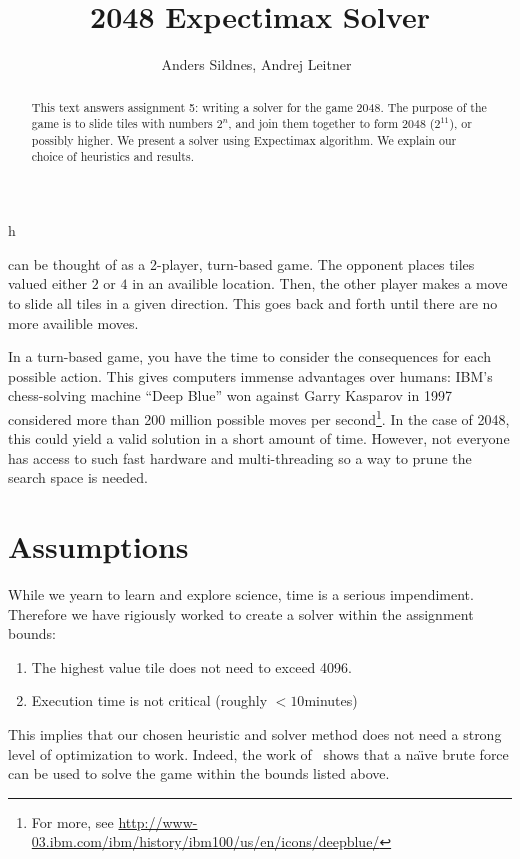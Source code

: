 \documentclass[journal]{IEEEtran}
\def\naive{na\"{\i}ve}
\begin{document}
%
\title{2048 Expectimax Solver}

\author{Anders Sildnes, Andrej Leitner~%
}%

%
{h}

\maketitle

\begin{abstract}
    This text answers assignment 5: writing a solver for the game 2048.
    The purpose of the game is to slide tiles with numbers $2^{n}$, and join them
    together to form 2048 ($2^{11}$), or possibly higher.
    We present a solver using Expectimax algorithm. We explain our choice of
    heuristics and results.
\end{abstract}

 can be thought of as a 2-player, turn-based game. The
opponent places tiles valued either $2$ or $4$ in an availible location. Then,
the other player makes a move to slide all tiles in a given direction. This
goes back and forth until there are no more availible moves.

In a turn-based game, you have the time to consider the consequences for each possible
action. This gives computers immense advantages over humans:
IBM's chess-solving machine ``Deep Blue'' won against Garry Kasparov in 1997 considered more than
200 million possible moves per second\footnote{For more, see
    \href{http://www-03.ibm.com/ibm/history/ibm100/us/en/icons/deepblue/}
{http://www-03.ibm.com/ibm/history/ibm100/us/en/icons/deepblue/}}.
In the case of 2048, this could yield a valid solution in a short amount of
time. However, not everyone has access to such fast hardware and
multi-threading so a way to prune the search space is needed.

\section*{Assumptions}
While we yearn to learn and explore science, time is a serious impendiment.
Therefore we have rigiously worked to create a solver within the assignment bounds:
\begin{enumerate}
    \item The highest value tile does not need to exceed 4096.
    \item Execution time is not critical (roughly $< 10$minutes)
\end{enumerate}
This implies that our chosen heuristic and solver method does not need a strong
level of optimization to work. Indeed, the work of~\cite{brutesolver} shows that
a \naive{} brute force can be used to solve the game within the bounds listed above.
\end{document}
